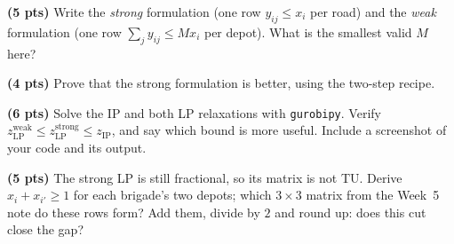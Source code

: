 \documentclass[10pt]{article}
\begin{document}
\begin{parts}
\item \textbf{(5 pts)} Write the \emph{strong} formulation (one row $y_{ij} \le x_i$ per
  road) and the \emph{weak} formulation (one row $\sum_j y_{ij} \le M x_i$ per depot).
  What is the smallest valid $M$ here?
\item \textbf{(4 pts)} Prove that the strong formulation is better, using the two-step
  recipe.
\item \textbf{(6 pts)} Solve the IP and both LP relaxations with \texttt{gurobipy}.
  Verify $z_{\mathrm{LP}}^{\text{weak}} \le z_{\mathrm{LP}}^{\text{strong}} \le z_{\mathrm{IP}}$,
  and say which bound is more useful. Include a screenshot of your code and its output.
\item \textbf{(5 pts)} The strong LP is still fractional, so its matrix is not TU.
  Derive $x_i + x_{i'} \ge 1$ for each brigade's two depots; which $3 \times 3$ matrix
  from the Week~5 note do these rows form? Add them, divide by $2$ and round up: does
  this cut close the gap?
\end{parts}
\end{document}
